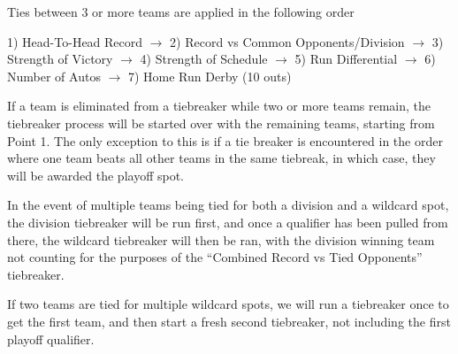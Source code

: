 \begin{deepEnumerate}
\begin{deepEnumerate}
\begin{deepEnumerate}
\begin{deepEnumerate}
				\item Ties between 3 or more teams are applied in the following order
				\begin{deepEnumerate}
					\item 1) Head-To-Head Record $\rightarrow$  
					2) Record vs Common Opponents/Division $\rightarrow$ 
					3) Strength of Victory $\rightarrow$ 
					4) Strength of Schedule $\rightarrow$ 
					5) Run Differential $\rightarrow$  
					6) Number of Autos $\rightarrow$  
					7) Home Run Derby (10 outs)
					\item If a team is eliminated from a tiebreaker while two or more teams remain, 
					the tiebreaker process will be started over with the remaining teams, starting from Point 1.  The only exception to this is if a tie breaker is encountered in the order where one team beats all other teams in the same tiebreak, in which case, they will be awarded the playoff spot.
				\end{deepEnumerate}
				\item In the event of multiple teams being tied for both a division and a wildcard spot, 
				the division tiebreaker will be run first, 
				and once a qualifier has been pulled from there, 
				the wildcard tiebreaker will then be ran, 
				with the division winning team not counting 
				for the purposes of the “Combined Record vs Tied Opponents” tiebreaker.
				\item If two teams are tied for multiple wildcard spots, 
				we will run a tiebreaker once to get the first team, 
				and then start a fresh second tiebreaker, 
				not including the first playoff qualifier.
			\end{deepEnumerate}
		\end{deepEnumerate}
	\end{deepEnumerate}
\end{deepEnumerate}
